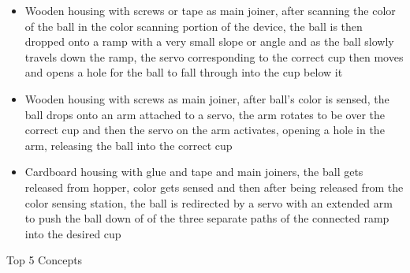 \documentclass{article}
\begin{document}
\begin{itemize}
    \item Wooden housing with screws or tape as main joiner, after scanning the color of the ball in the color scanning portion of the device, the ball is then dropped onto a ramp with a very small slope or angle and as the ball slowly travels down the ramp, the servo corresponding to the correct cup then moves and opens a hole for the ball to fall through into the cup below it
    \item Wooden housing with screws as main joiner, after ball’s color is sensed, the ball drops onto an arm attached to a servo, the arm rotates to be over the correct cup and then the servo on the arm activates, opening a hole in the arm, releasing the ball into the correct cup
    \item   Cardboard housing with glue and tape and main joiners, the ball gets released from hopper, color gets sensed and then after being released from the color sensing station, the ball is redirected by a servo with an extended arm to push the ball down of of the three separate paths of the connected ramp into the desired cup
\end{itemize}

\begin{center}
    Top 5 Concepts
\end{center}
\end{document}
